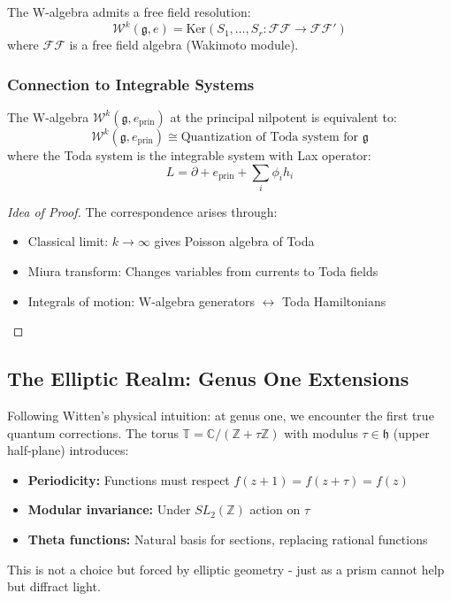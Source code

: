 \begin{theorem}\label{thm:screen-res}
The W-algebra admits a free field resolution:
\[
\mathcal{W}^k(\mathfrak{g}, e) = \mathrm{Ker}(S_1, \ldots, S_r : \mathcal{FF} \to \mathcal{FF}')
\]
where $\mathcal{FF}$ is a free field algebra (Wakimoto module).
\end{theorem}

\subsubsection{Connection to Integrable Systems}

\begin{theorem}\label{thm:w-toda}
The W-algebra $\mathcal{W}^k(\mathfrak{g}, e_{\mathrm{prin}})$ at the principal nilpotent is equivalent to:
\[
\mathcal{W}^k(\mathfrak{g}, e_{\mathrm{prin}}) \cong \text{Quantization of Toda system for } \mathfrak{g}
\]
where the Toda system is the integrable system with Lax operator:
\[
L = \partial + e_{\mathrm{prin}} + \sum_{i} \phi_i h_i
\]
\end{theorem}

\begin{proof}[Idea of Proof]
The correspondence arises through:
\begin{itemize}
\item Classical limit: $k \to \infty$ gives Poisson algebra of Toda
\item Miura transform: Changes variables from currents to Toda fields
\item Integrals of motion: W-algebra generators $\leftrightarrow$ Toda Hamiltonians
\end{itemize}
\end{proof}


\subsection{The Elliptic Realm: Genus One Extensions}\label{subsec:elliptic}

\begin{remark}
Following Witten's physical intuition: at genus one, we encounter the first true quantum corrections. The torus $\mathbb{T} = \mathbb{C}/(\mathbb{Z} + \tau\mathbb{Z})$ with modulus $\tau \in \mathfrak{h}$ (upper half-plane) introduces:
\begin{itemize}
\item \textbf{Periodicity:} Functions must respect $f(z + 1) = f(z + \tau) = f(z)$
\item \textbf{Modular invariance:} Under $SL_2(\mathbb{Z})$ action on $\tau$
\item \textbf{Theta functions:} Natural basis for sections, replacing rational functions
\end{itemize}
This is not a choice but forced by elliptic geometry - just as a prism cannot help but diffract light.
\end{remark}

